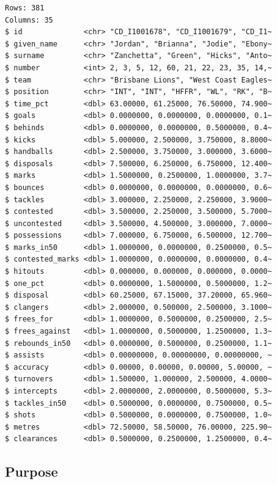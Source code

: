 \documentclass[
  letterpaper,
]{krantz}
\begin{document}
\begin{verbatim}
Rows: 381
Columns: 35
$ id              <chr> "CD_I1001678", "CD_I1001679", "CD_I1~
$ given_name      <chr> "Jordan", "Brianna", "Jodie", "Ebony~
$ surname         <chr> "Zanchetta", "Green", "Hicks", "Anto~
$ number          <int> 2, 3, 5, 12, 60, 21, 22, 23, 35, 14,~
$ team            <chr> "Brisbane Lions", "West Coast Eagles~
$ position        <chr> "INT", "INT", "HFFR", "WL", "RK", "B~
$ time_pct        <dbl> 63.00000, 61.25000, 76.50000, 74.900~
$ goals           <dbl> 0.0000000, 0.0000000, 0.0000000, 0.1~
$ behinds         <dbl> 0.0000000, 0.0000000, 0.5000000, 0.4~
$ kicks           <dbl> 5.000000, 2.500000, 3.750000, 8.8000~
$ handballs       <dbl> 2.500000, 3.750000, 3.000000, 3.6000~
$ disposals       <dbl> 7.500000, 6.250000, 6.750000, 12.400~
$ marks           <dbl> 1.5000000, 0.2500000, 1.0000000, 3.7~
$ bounces         <dbl> 0.0000000, 0.0000000, 0.0000000, 0.6~
$ tackles         <dbl> 3.000000, 2.250000, 2.250000, 3.9000~
$ contested       <dbl> 3.500000, 2.250000, 3.500000, 5.7000~
$ uncontested     <dbl> 3.500000, 4.500000, 3.000000, 7.0000~
$ possessions     <dbl> 7.000000, 6.750000, 6.500000, 12.700~
$ marks_in50      <dbl> 1.0000000, 0.0000000, 0.2500000, 0.5~
$ contested_marks <dbl> 1.0000000, 0.0000000, 0.0000000, 0.4~
$ hitouts         <dbl> 0.000000, 0.000000, 0.000000, 0.0000~
$ one_pct         <dbl> 0.0000000, 1.5000000, 0.5000000, 1.2~
$ disposal        <dbl> 60.25000, 67.15000, 37.20000, 65.960~
$ clangers        <dbl> 2.000000, 0.500000, 2.500000, 3.1000~
$ frees_for       <dbl> 1.0000000, 0.5000000, 0.2500000, 2.5~
$ frees_against   <dbl> 1.0000000, 0.5000000, 1.2500000, 1.3~
$ rebounds_in50   <dbl> 0.0000000, 0.5000000, 0.2500000, 1.1~
$ assists         <dbl> 0.00000000, 0.00000000, 0.00000000, ~
$ accuracy        <dbl> 0.00000, 0.00000, 0.00000, 5.00000, ~
$ turnovers       <dbl> 1.500000, 1.000000, 2.500000, 4.0000~
$ intercepts      <dbl> 2.0000000, 2.0000000, 0.5000000, 5.3~
$ tackles_in50    <dbl> 0.5000000, 0.0000000, 0.7500000, 0.5~
$ shots           <dbl> 0.5000000, 0.0000000, 0.7500000, 1.0~
$ metres          <dbl> 72.50000, 58.50000, 76.00000, 225.90~
$ clearances      <dbl> 0.5000000, 0.2500000, 1.2500000, 0.4~
\end{verbatim}

\subsection*{Purpose}\label{purpose}
\end{document}
